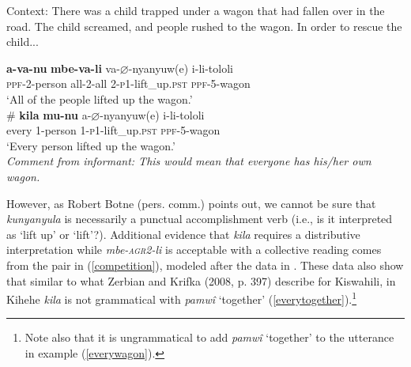 \documentclass[letterpaper, 12pt]{article}
\let\emptyset\varnothing
\begin{document}
\begin{exe}

 \ex Context: There was a child trapped under a wagon that had fallen over in the road. The child screamed, and people rushed to the wagon. In order to rescue the child... \\ \label{wagon}

\begin{xlist}

\ex \gll \textbf{a-va-nu} \textbf{mbe-va-li} va-$\emptyset$-nyanyuw(e) i-li-tololi \\
\textsc{ppf}-2-person all-2-all 2-\textsc{p1}-lift\_up.\textsc{pst} \textsc{ppf}-5-wagon  \\
`All of the people lifted up the wagon.' \\


\ex \gll \# \textbf{kila} \textbf{mu-nu} a-$\emptyset$-nyanyuw(e) i-li-tololi \\ 
{} every 1-person 1-\textsc{p1}-lift\_up.\textsc{pst} \textsc{ppf}-5-wagon  \\
`Every person lifted up the wagon.' \\ \label{everywagon}
\textit{Comment from informant: This would mean that everyone has his/her own wagon.}

\end{xlist}
\end{exe}


However, as Robert Botne (pers. comm.) points out, we cannot be sure that \textit{kunyanyula} is necessarily a punctual accomplishment verb (i.e., is it interpreted as `lift up' or `lift'?). Additional evidence that \textit{kila} requires a distributive interpretation while \textit{mbe-\textsc{agr2}-li} is acceptable with a collective reading comes from the pair in (\ref{competition}), modeled after the data in . These data also show that similar to what Zerbian and Krifka (2008, p. 397) describe for Kiswahili, in Kihehe \textit{kila} is not grammatical with \textit{pamw\^i} `together' (\ref{everytogether}).\footnote{Note also that it is ungrammatical to add \textit{pamw\^i} `together' to the utterance in example (\ref{everywagon}).\label{footnotecompetition}}
\end{document}
